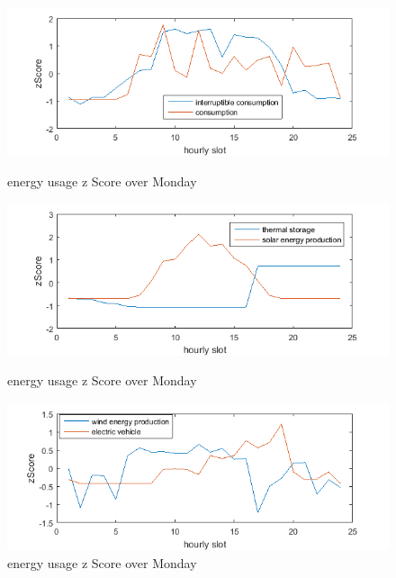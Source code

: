 \begin{figure}
\centering
\includegraphics[scale=0.9]{daily1.png}
\caption{energy usage z Score over Monday}
\label{fig:daily1}
\includegraphics[scale=0.9]{daily2.png}
\caption{energy usage z Score over Monday}
\label{fig:daily2}
\includegraphics[scale=0.9]{daily3.png}
\caption{energy usage z Score over Monday}
\label{fig:daily3}
\end{figure}

